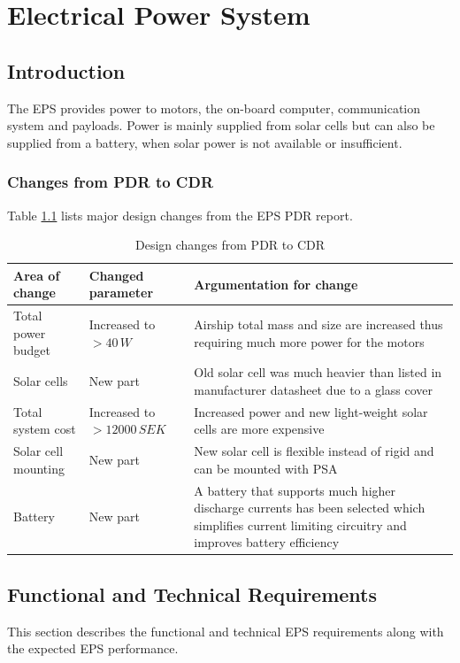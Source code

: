 \chapter{Electrical Power System}
\label{chap:eps}

\section{Introduction}
\label{sec:introduction}

The \ac{EPS} provides power to motors, the on-board computer, communication system and payloads. Power is mainly supplied from solar cells but can also be supplied from a battery, when solar power is not available or insufficient. 

\enlargethispage{2.0em}

\subsection{Changes from PDR to CDR}
\label{sec:changes_pdr_to_cdr}
%
Table \ref{tab:pdr_to_cdr} lists major design changes from the \ac{EPS} \ac{PDR} report.

\begin{table}[H]
\centering
\caption{Design changes from PDR to CDR}
\label{tab:pdr_to_cdr}
\begin{tabular}{p{}p{}p{}}
\hline
\textbf{Area of change} & \textbf{Changed parameter } & \textbf{Argumentation for change}\\
\hline
Total power budget & Increased to $>40\,W$ & Airship total mass and size are increased thus requiring much more power for the motors\\
Solar cells & New part & Old solar cell was much heavier than listed in manufacturer datasheet due to a glass cover\\
Total system cost & Increased to $>12000\,SEK$ & Increased power and new light-weight solar cells are more expensive\\
Solar cell mounting & New part & New solar cell is flexible instead of rigid and can be mounted with \ac{PSA}\\
Battery & New part & A battery that supports much higher discharge currents has been selected which simplifies current limiting circuitry and improves battery efficiency\\
\hline
\end{tabular}
\end{table} 
%
%
\section{Functional and Technical Requirements}
\label{sec:requirements}
This section describes the functional and technical \ac{EPS} requirements along with the expected \ac{EPS} performance.
%

